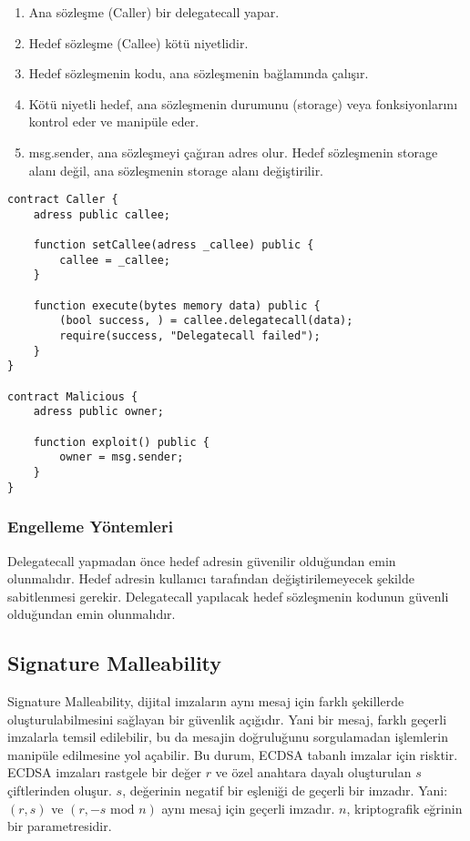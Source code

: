 \begin{enumerate}
    \item Ana sözleşme (Caller) bir delegatecall yapar.
    \item Hedef sözleşme (Callee) kötü niyetlidir.
    \item Hedef sözleşmenin kodu, ana sözleşmenin bağlamında çalışır. 
    \item Kötü niyetli hedef, ana sözleşmenin durumunu (storage) veya fonksiyonlarını kontrol eder ve manipüle eder.
    \item msg.sender, ana sözleşmeyi çağıran adres olur. Hedef sözleşmenin storage alanı değil, ana sözleşmenin storage alanı değiştirilir.
\end{enumerate}

\begin{lstlisting}
contract Caller {
    adress public callee;

    function setCallee(adress _callee) public {
        callee = _callee;
    }

    function execute(bytes memory data) public {
        (bool success, ) = callee.delegatecall(data);
        require(success, "Delegatecall failed");
    }
}

contract Malicious {
    adress public owner;

    function exploit() public {
        owner = msg.sender;
    }
}
\end{lstlisting}

\subsubsection{Engelleme Yöntemleri}

Delegatecall yapmadan önce hedef adresin güvenilir olduğundan emin olunmalıdır. Hedef adresin kullanıcı tarafından değiştirilemeyecek şekilde sabitlenmesi gerekir. Delegatecall yapılacak hedef sözleşmenin kodunun güvenli olduğundan emin olunmalıdır.

\newpage

\subsection{Signature Malleability}

Signature Malleability, dijital imzaların aynı mesaj için farklı şekillerde oluşturulabilmesini sağlayan bir güvenlik açığıdır. Yani bir mesaj, farklı geçerli imzalarla temsil edilebilir, bu da mesajin doğruluğunu sorgulamadan işlemlerin manipüle edilmesine yol açabilir. Bu durum, ECDSA tabanlı imzalar için risktir. ECDSA imzaları rastgele bir değer $r$ ve özel anahtara dayalı oluşturulan $s$ çiftlerinden oluşur. $s$, değerinin negatif bir eşleniği de geçerli bir imzadır. Yani:
$(r, s)$ ve $(r, -s \text{ mod } n )$ aynı mesaj için geçerli imzadır. $n$, kriptografik eğrinin bir parametresidir. 

